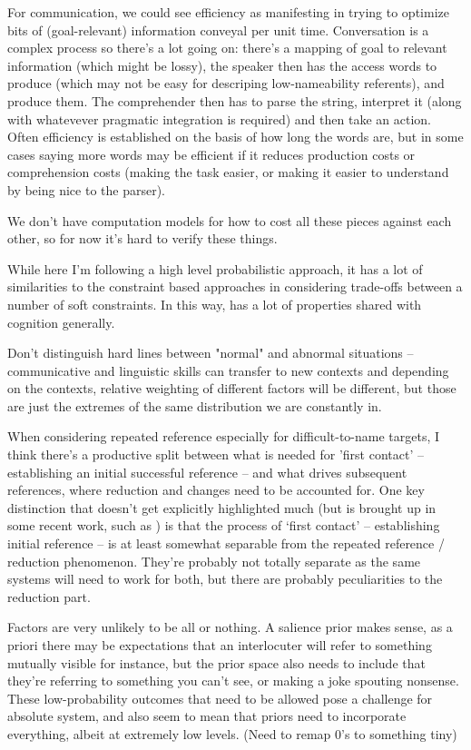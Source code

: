 \documentclass[]{article}
\begin{document}
For communication, we could see efficiency as manifesting in trying to optimize bits of (goal-relevant) information conveyal per unit time. Conversation is a complex process so there's a lot going on: there's a mapping of goal to relevant information (which might be lossy), the speaker then has the access words to produce (which may not be easy for descriping low-nameability referents), and produce them. The comprehender then has to parse the string, interpret it (along with whatevever pragmatic integration is required) and then take an action. Often efficiency is established on the basis of how long the words are, but in some cases saying more words may be efficient if it reduces production costs or comprehension costs (making the task easier, or making it easier to understand by being nice to the parser). 

We don't have computation models for how to cost all these pieces against each other, so for now it's hard to verify these things. 

While here I'm following a high level probabilistic approach, it has a lot of similarities to the constraint based approaches in considering trade-offs between a number of soft constraints. In this way, has a lot of properties shared with cognition generally. 

Don't distinguish hard lines between "normal" and abnormal situations -- communicative and linguistic skills can transfer to new contexts and depending on the contexts, relative weighting of different factors will be different, but those are just the extremes of the same distribution we are constantly in. 

When considering repeated reference especially for difficult-to-name targets, I think there's a productive split between what is needed for 'first contact' -- establishing an initial successful reference -- and what drives subsequent references, where reduction and changes need to be accounted for. One key distinction that doesn't get explicitly highlighted much (but is brought up in some recent work, such as \cite{leung2023}) is that the process of `first contact' -- establishing initial reference -- is at least somewhat separable from the repeated reference / reduction phenomenon. They're probably not totally separate as the same systems will need to work for both, but there are probably peculiarities to the reduction part. 

Factors are very unlikely to be all or nothing. A salience prior makes sense, as a priori there may be expectations that an interlocuter will refer to something mutually visible for instance, but the prior space also needs to include that they're referring to something you can't see, or making a joke spouting nonsense. These low-probability outcomes that need to be allowed pose a challenge for absolute system, and also seem to mean that priors need to incorporate everything, albeit at extremely low levels. (Need to remap 0's to something tiny) 
\end{document}
